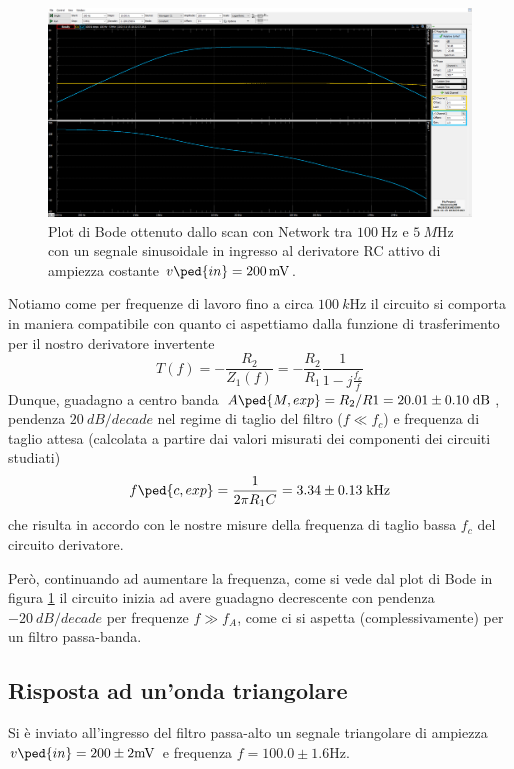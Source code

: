 \documentclass[10pt, a4paper, italian]{article}
\begin{document}
\begin{figure}[htbp]
\centering
\includegraphics[scale=0.335]{hpfbode}
\caption{Plot di Bode ottenuto dallo scan con Network tra $\SI{100}{\Hz}$ e
$\SI{5}{M\Hz}$ con un segnale sinusoidale in ingresso al derivatore RC attivo
di ampiezza costante $v\ped{in} = \SI{200}{m\V}$.
\label{fig: derbode}}
\end{figure}

Notiamo come per frequenze di lavoro fino a circa $\SI{100}{k\Hz}$ il circuito si
comporta in maniera compatibile con quanto ci aspettiamo dalla funzione di
trasferimento per il nostro derivatore invertente
\begin{equation}\label{eq: hpfTfunc}
T(f) = - \frac{R_2}{Z_1(f)} = - \frac{R_2}{R_1} \frac{1}{1 - j \frac{f_c}{f}}
\end{equation}
Dunque, guadagno a centro banda
$A\ped{M, exp} = R_2/R1 = 20.01 \pm 0.10 \; \si{dB}$, pendenza
$\SI{20}{dB/decade}$ nel regime di taglio del filtro ($f \ll f_c$)
e frequenza di taglio attesa (calcolata a partire dai valori misurati dei
componenti dei circuiti studiati)
\begin{equation}\label{eq: hpfcut}
f\ped{c, exp} = \frac{1}{2\pi R_1 C} = 3.34 \pm 0.13 \; \si{k\Hz}
\end{equation}
che risulta in accordo con le nostre misure della frequenza di taglio
bassa $f_c$ del circuito derivatore.

Però, continuando ad aumentare la frequenza, come si vede dal plot di Bode in
figura \ref{fig: derbode} il circuito inizia ad avere guadagno decrescente con
pendenza $\SI{-20}{dB/decade}$ per frequenze $f \gg f_A$, come ci si aspetta
(complessivamente) per un filtro passa-banda.
 
\subsection{Risposta ad un'onda triangolare}
Si è inviato all'ingresso del filtro passa-alto un segnale triangolare di
ampiezza $v\ped{in} = 200 \pm 2 \si{m\V}$ e frequenza
$f = 100.0 \pm 1.6 \si{\Hz}$.
\end{document}
